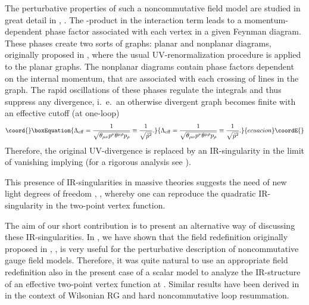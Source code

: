 \documentclass[a4paper,12pt]{article}
\begin{document}
The perturbative properties of such a noncommutative field model are studied in great detail in \cite{Minwalla:1999px}, \cite{VanRaamsdonk:2000rr}. The \myHighlight{$\star$}\coordHE{}-product in the interaction term leads to a momentum-dependent phase factor associated with each vertex in a given Feynman diagram. These phases create two sorts of graphs: planar and nonplanar diagrams, originally proposed in \cite{Filk:dm}, where the usual UV-renormalization procedure is applied to the planar graphs. The nonplanar diagrams contain phase factors dependent on the internal momentum, that are associated with each crossing of lines in the graph. The rapid oscillations of these phases regulate the integrals and thus suppress any divergence, i.~e.\ an otherwise divergent graph becomes finite with an effective cutoff (at one-loop)
\begin{equation}\coord{}\boxEquation{
  \Lambda_\mathrm{eff} = \frac{1}{\sqrt{\theta_{\mu\nu} p^\nu \theta^{\mu\rho}
    p_\rho}} \equiv \frac{1}{\sqrt{\tilde{p}^2}}.
}{
  \Lambda_\mathrm{eff} = \frac{1}{\sqrt{\theta_{\mu\nu} p^\nu \theta^{\mu\rho}
    p_\rho}} \equiv \frac{1}{\sqrt{\tilde{p}^2}}.
}{ecuacion}\coordE{}\end{equation}
Therefore, the original UV-divergence is replaced by an IR-singularity in the limit of vanishing \coordHE{} implying \coordHE{} (for a rigorous analysis see \cite{Chepelev:2000hm}).

This presence of IR-singularities in massive theories suggests the need of new light degrees of freedom \cite{Minwalla:1999px}, \cite{VanRaamsdonk:2000rr}, whereby one can reproduce the quadratic IR-singularity in the two-point vertex function.

The aim of our short contribution is to present an alternative way of discussing these IR-singularities. In \cite{Bichl:2001cq}, \cite{redef} we have shown that the field redefinition originally proposed in \cite{Bichl:2001nf}, \cite{Bastianelli:1990ey}, \cite{Alfaro:1992cs} is very useful for the perturbative description of noncommutative \coordHE{} gauge field models. Therefore, it was quite natural to use an appropriate field redefinition also in the present case of a scalar model to analyze the IR-structure of an effective two-point vertex function at \coordHE{}. Similar results have been derived in \cite{Griguolo:2001ez} in the context of Wilsonian RG and hard noncommutative loop resummation.
\end{document}
